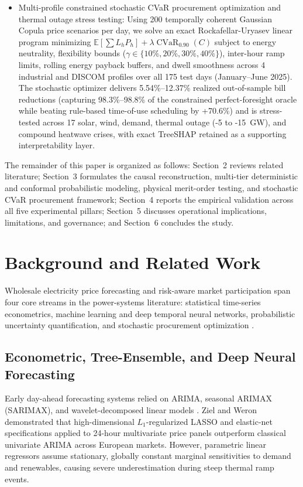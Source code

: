\documentclass[runningheads,a4paper]{llncs}
\begin{document}
\begin{itemize}
    \item Multi-profile constrained stochastic CVaR procurement optimization and thermal outage stress testing: Using 200 temporally coherent Gaussian Copula price scenarios per day, we solve an exact Rockafellar-Uryasev linear program minimizing $\mathbb{E}[\sum L_h P_h] + \lambda \operatorname{CVaR}_{0.90}(C)$ subject to energy neutrality, flexibility bounds ($\gamma \in \{10\%, 20\%, 30\%, 40\%\}$), inter-hour ramp limits, rolling energy payback buffers, and dwell smoothness across 4 industrial and DISCOM profiles over all 175 test days (January--June 2025). The stochastic optimizer delivers 5.54\%--12.37\% realized out-of-sample bill reductions (capturing 98.3\%--98.8\% of the constrained perfect-foresight oracle while beating rule-based time-of-use scheduling by +70.6\%) and is stress-tested across 17 solar, wind, demand, thermal outage (-5 to -15~GW), and compound heatwave crises, with exact TreeSHAP retained as a supporting interpretability layer.
\end{itemize}

The remainder of this paper is organized as follows: Section~2 reviews related literature; Section~3 formulates the causal reconstruction, multi-tier deterministic and conformal probabilistic modeling, physical merit-order testing, and stochastic CVaR procurement framework; Section~4 reports the empirical validation across all five experimental pillars; Section~5 discusses operational implications, limitations, and governance; and Section~6 concludes the study.

\section{Background and Related Work}
Wholesale electricity price forecasting and risk-aware market participation span four core streams in the power-systems literature: statistical time-series econometrics, machine learning and deep temporal neural networks, probabilistic uncertainty quantification, and stochastic procurement optimization \cite{weron2014electricity,nowotarski2018recent,lago2021forecasting}.

\subsection{Econometric, Tree-Ensemble, and Deep Neural Forecasting}
Early day-ahead forecasting systems relied on ARIMA, seasonal ARIMAX (SARIMAX), and wavelet-decomposed linear models \cite{contreras2003arima,conejo2005day}. Ziel and Weron \cite{ziel2018day} demonstrated that high-dimensional $L_1$-regularized LASSO and elastic-net specifications applied to 24-hour multivariate price panels outperform classical univariate ARIMA across European markets. However, parametric linear regressors assume stationary, globally constant marginal sensitivities to demand and renewables, causing severe underestimation during steep thermal ramp events.
\end{document}
